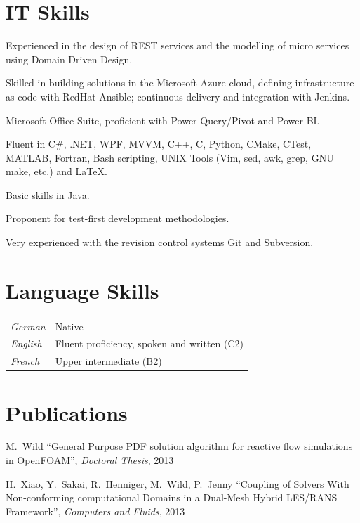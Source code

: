 \documentclass[line,11pt,a4paper]{../resume}
\begin{document}
\begin{resume}
\section{\mysidestyle IT Skills}\vspace{6mm}
\begin{list2}
  \item Experienced in the design of REST services and the modelling of micro
    services using Domain Driven Design.
  \item Skilled in building solutions in the Microsoft Azure cloud, defining
    infrastructure as code with RedHat Ansible; continuous delivery and
    integration with Jenkins.
  \item Microsoft Office Suite, proficient with Power Query/Pivot and Power BI.
  \item Fluent in C\#, .NET, WPF, MVVM, C++, C, Python, CMake, CTest, MATLAB,
    Fortran, Bash scripting, UNIX Tools (Vim, sed, awk, grep, GNU make, etc.)
    and {\selectfont\LaTeX}.
  \item Basic skills in Java.
  \item Proponent for test-first development methodologies.
  \item Very experienced with the revision control systems Git and Subversion.
\end{list2}

\section{\mysidestyle Language Skills}\vspace{2mm}
\begin{tabular}{@{}ll}
  \textsl{German}   & Native \\
  \textsl{English}  & Fluent proficiency, spoken and written (C2) \\
  \textsl{French}  & Upper intermediate (B2) \\
\end{tabular}

\pagebreak
\section{\mysidestyle Publications}\vspace{2mm}
M.~Wild
``General Purpose PDF solution algorithm for reactive flow simulations in
OpenFOAM'', \textsl{Doctoral Thesis}, 2013

\vspace{-3mm}
H.~Xiao, Y.~Sakai, R.~Henniger, M.~Wild, P.~Jenny
``Coupling of Solvers With Non-conforming computational Domains in a Dual-Mesh
Hybrid LES/RANS Framework'', \textsl{Computers and Fluids}, 2013


\end{resume}
\end{document}
